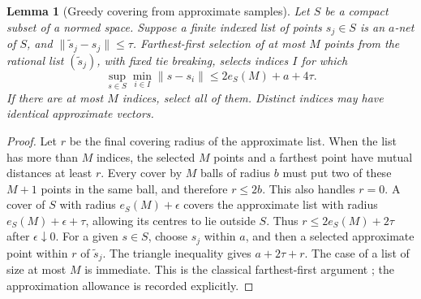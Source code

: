 \documentclass[11pt]{amsart}
\newtheorem{lemma}[theorem]{Lemma}
\theoremstyle{definition}\newtheorem{definition}[theorem]{Definition}
\theoremstyle{remark}\newtheorem{remark}[theorem]{Remark}
\begin{document}
\begin{lemma}[Greedy covering from approximate samples]\label{lem:finite-greedy}
Let $S$ be a compact subset of a normed space. Suppose a finite indexed
list of points $s_j\in S$ is an $a$-net of $S$, and
$\|\widetilde s_j-s_j\|\le\tau$. Farthest-first selection of at most
$M$ points from the rational list $(\widetilde s_j)$, with fixed tie
breaking, selects indices $I$ for which
\[
 \sup_{s\in S}\min_{i\in I}\|s-s_i\|
                 \le 2e_S(M)+a+4\tau.
\]
If there are at most $M$ indices, select all of them. Distinct indices
may have identical approximate vectors.
\end{lemma}
\begin{proof}
Let $r$ be the final covering radius of the approximate list. When the
list has more than $M$ indices, the selected $M$ points and a farthest
point have mutual distances at least $r$. Every cover by $M$ balls of
radius $b$ must put two of these $M+1$ points in the same ball, and
therefore $r\le2b$. This also handles $r=0$. A cover of $S$ with
radius $e_S(M)+\epsilon$ covers the approximate list with radius
$e_S(M)+\epsilon+\tau$, allowing its centres to lie outside $S$.
Thus $r\le2e_S(M)+2\tau$ after $\epsilon\downarrow0$.
For a given $s\in S$, choose $s_j$ within $a$, and then a selected
approximate point within $r$ of $\widetilde s_j$. The triangle
inequality gives $a+2\tau+r$. The case of a list of size at most $M$
is immediate. This is the classical farthest-first argument
\cite{Gonzalez}; the approximation allowance is recorded explicitly.
\end{proof}
\end{document}
